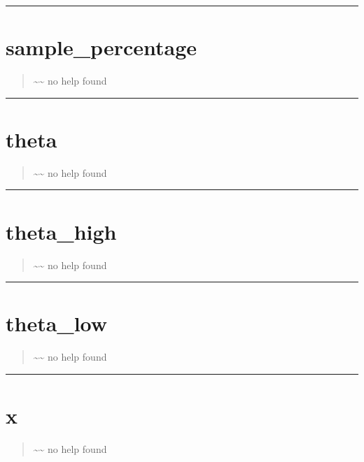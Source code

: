 \documentclass[letterpaper,10pt,english]{sphinxmanual}
\begin{document}
\bigskip\hrule{}\bigskip



\section{sample\_percentage}
\label{classes/utils/@hdmr/hdmr:id25}\label{classes/utils/@hdmr/hdmr:sample-percentage}\begin{quote}

\textasciitilde{}\textasciitilde{} no help found
\end{quote}


\bigskip\hrule{}\bigskip



\section{theta}
\label{classes/utils/@hdmr/hdmr:theta}\label{classes/utils/@hdmr/hdmr:id26}\begin{quote}

\textasciitilde{}\textasciitilde{} no help found
\end{quote}


\bigskip\hrule{}\bigskip



\section{theta\_high}
\label{classes/utils/@hdmr/hdmr:id27}\label{classes/utils/@hdmr/hdmr:theta-high}\begin{quote}

\textasciitilde{}\textasciitilde{} no help found
\end{quote}


\bigskip\hrule{}\bigskip



\section{theta\_low}
\label{classes/utils/@hdmr/hdmr:theta-low}\label{classes/utils/@hdmr/hdmr:id28}\begin{quote}

\textasciitilde{}\textasciitilde{} no help found
\end{quote}


\bigskip\hrule{}\bigskip



\section{x}
\label{classes/utils/@hdmr/hdmr:id29}\label{classes/utils/@hdmr/hdmr:x}\begin{quote}

\textasciitilde{}\textasciitilde{} no help found
\end{quote}
\end{document}
